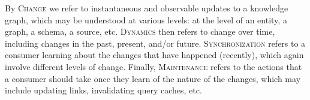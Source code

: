 \documentclass[sw]{iosart2x}
\begin{document}
By \textsc{Change} we refer to instantaneous and observable updates to a knowledge graph, which may be understood at various levels: at the level of an entity, a graph, a schema, a source, etc. \textsc{Dynamics} then refers to change over time, including changes in the past, present, and/or future. \textsc{Synchronization} refers to a consumer learning about the changes that have happened (recently), which again involve different levels of change. Finally,  \textsc{Maintenance} refers to the actions that a consumer should take once they learn of the nature of the changes, which may include updating links, invalidating query caches, etc.

%
\end{document}

